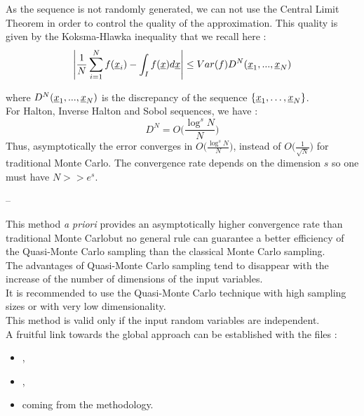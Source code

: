 {As the sequence is not randomly generated, we can not use the Central Limit Theorem in order to control the quality of the approximation. This quality is given by the  Koksma-Hlawka inequality that we recall here : 
 $$
  \left\lvert \frac{1}{N}\sum_{i=1}^Nf({\underline{x}}_i) - \int_If({\underline{x}})d{\underline{x}} \right\rvert \le Var(f)D^N({\underline{x}}_1, ..., {\underline{x}}_N)
  $$

where $D^N({\underline{x}}_1, ..., {\underline{x}}_N)$ is the discrepancy of the sequence $\{{\underline{x}}_1, \hdots, {\underline{x}}_N\}$.\\

For Halton, Inverse Halton and Sobol sequences, we have : 
$$
D^N = O\biggl(\frac{\log^s{N}}{N}\biggr)
$$
Thus, asymptotically the error converges in $O\biggl(\frac{\log^s{N}}{N}\biggr)$, instead of $O\biggl(\frac{1}{\sqrt{N}}\biggr)$ for traditional Monte Carlo. The convergence rate depends on the dimension $s$ so one must have $N >> e^s$.
}
{
  --
}

{This method \textit{a priori} provides an asymptotically higher convergence rate than traditional Monte Carlobut no general rule can guarantee a better efficiency of the Quasi-Monte Carlo sampling than the classical Monte Carlo sampling.\\
The advantages of Quasi-Monte Carlo sampling tend to disappear with the increase of the number of dimensions of the input variables. \\
It is recommended to use the Quasi-Monte Carlo technique with high sampling sizes or with very low dimensionality.\\
This method is valid only if the input random variables are independent.\\
A fruitful link towards the global approach can be established with the files : 
  \begin{itemize}
  \item {},
  \item   {},
  \item  {} coming from the methodology.
\end{itemize}
}

\Example{
 --
}
